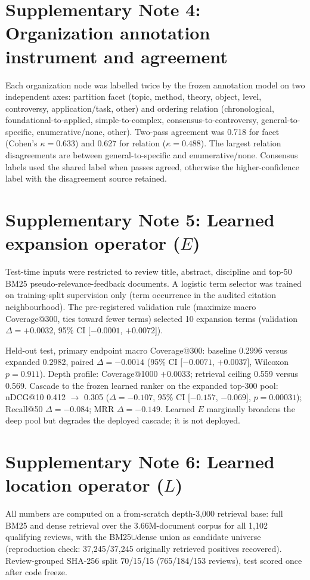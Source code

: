 \documentclass[11pt,a4paper]{article}
\newcommand{\snote}[1]{\section*{Supplementary Note #1}}
\begin{document}
\snote{4: Organization annotation instrument and agreement}

Each organization node was labelled twice by the frozen annotation model on two independent axes: partition facet (topic, method, theory, object, level, controversy, application/task, other) and ordering relation (chronological, foundational-to-applied, simple-to-complex, consensus-to-controversy, general-to-specific, enumerative/none, other). Two-pass agreement was 0.718 for facet (Cohen's $\kappa=0.633$) and 0.627 for relation ($\kappa=0.488$). The largest relation disagreements are between general-to-specific and enumerative/none. Consensus labels used the shared label when passes agreed, otherwise the higher-confidence label with the disagreement source retained.

\snote{5: Learned expansion operator ($E$)}

Test-time inputs were restricted to review title, abstract, discipline and top-50 BM25 pseudo-relevance-feedback documents. A logistic term selector was trained on training-split supervision only (term occurrence in the audited citation neighbourhood). The pre-registered validation rule (maximize macro Coverage@300, ties toward fewer terms) selected 10 expansion terms (validation $\Delta=+0.0032$, 95\% CI [$-0.0001$, $+0.0072$]).

Held-out test, primary endpoint macro Coverage@300: baseline 0.2996 versus expanded 0.2982, paired $\Delta=-0.0014$ (95\% CI [$-0.0071$, $+0.0037$], Wilcoxon $p=0.911$). Depth profile: Coverage@1000 $+0.0033$; retrieval ceiling 0.559 versus 0.569. Cascade to the frozen learned ranker on the expanded top-300 pool: nDCG@10 0.412 $\rightarrow$ 0.305 ($\Delta=-0.107$, 95\% CI [$-0.157$, $-0.069$], $p=0.00031$); Recall@50 $\Delta=-0.084$; MRR $\Delta=-0.149$. Learned $E$ marginally broadens the deep pool but degrades the deployed cascade; it is not deployed.

\snote{6: Learned location operator ($L$)}

All numbers are computed on a from-scratch depth-3,000 retrieval base: full BM25 and dense retrieval over the 3.66M-document corpus for all 1,102 qualifying reviews, with the BM25$\cup$dense union as candidate universe (reproduction check: 37,245/37,245 originally retrieved positives recovered). Review-grouped SHA-256 split 70/15/15 (765/184/153 reviews), test scored once after code freeze.
\end{document}
